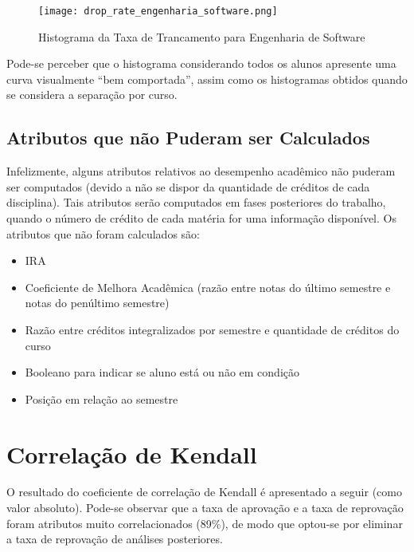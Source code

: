 \begin{figure}[!ht]
    \caption{Histograma da Taxa de Trancamento para Engenharia de Software}
    \centering
    \texttt{[image: drop\_rate\_engenharia\_software.png]}
    \label{drop_rate_eng_soft}
\end{figure}

Pode-se perceber que o histograma considerando todos os alunos apresente uma
curva visualmente ``bem comportada'', assim como os histogramas obtidos quando se considera a
separação por curso. \clearpage

\subsection{Atributos que não Puderam ser Calculados} \label{atributos_problematicos}
Infelizmente, alguns atributos relativos ao desempenho acadêmico não puderam ser
computados (devido a não se dispor da quantidade de créditos de cada disciplina).
Tais atributos serão computados em fases posteriores do trabalho, quando o número de
crédito de cada matéria for uma informação disponível. Os atributos que não foram
calculados são: 
\begin{itemize}
    \item IRA
    \item Coeficiente de Melhora Acadêmica (razão entre notas do último semestre e
        notas do penúltimo semestre)
    \item Razão entre créditos integralizados por semestre e quantidade de créditos
        do curso
    \item Booleano para indicar se aluno está ou não em condição
    \item Posição em relação ao semestre
\end{itemize}

\section{Correlação de Kendall}
O resultado do coeficiente de correlação de Kendall é apresentado a seguir (como
valor absoluto). Pode-se observar que a taxa de aprovação e a taxa de reprovação
foram atributos muito correlacionados (89\%), de modo que optou-se por eliminar a taxa de
reprovação de análises posteriores. 


